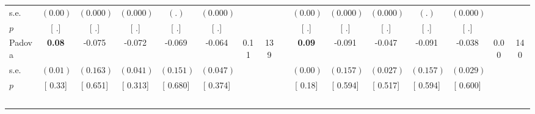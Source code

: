 \begin{longtable}{L{8em} c c c c c c c p{1em} c c c c c c c}
\quad \quad \quad \quad s.e.& $ (     0.00)$ & $ (    0.000)$ & $ (    0.000)$ & $ (        .)$ & $ (    0.000)$ & & & & $ (     0.00)$ & $ (    0.000)$ & $ (    0.000)$ & $ (        .)$ & $ (    0.000)$ & &  \\*
\quad \quad \quad \quad $ p$ & [        .] & [        .] & [        .] & [        .] & [        .] & & & & [        .] & [        .] & [        .] & [        .] & [        .] & &  \\[1em]
\quad \quad \quad Padova& \textbf{     0.08} &    -0.075 &    -0.072 &    -0.069 &    -0.064 &      0.11 &       139 & & \textbf{     0.09} &    -0.091 &    -0.047 &    -0.091 &    -0.038 &      0.00 &       140  \\*
\quad \quad \quad \quad s.e.& $ (     0.01)$ & $ (    0.163)$ & $ (    0.041)$ & $ (    0.151)$ & $ (    0.047)$ & & & & $ (     0.00)$ & $ (    0.157)$ & $ (    0.027)$ & $ (    0.157)$ & $ (    0.029)$ & &  \\*
\quad \quad \quad \quad $ p$ & [     0.33] & [    0.651] & [    0.313] & [    0.680] & [    0.374] & & & & [     0.18] & [    0.594] & [    0.517] & [    0.594] & [    0.600] & &  \\[1em]
~\\[1em]
\end{longtable}